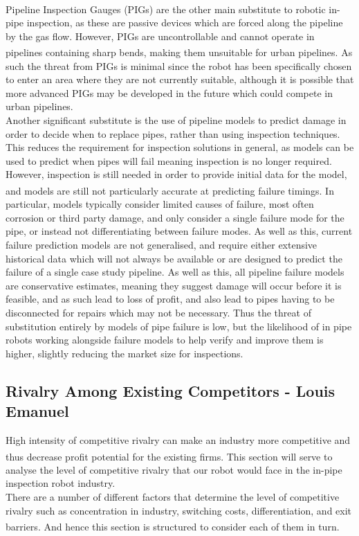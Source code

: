 \documentclass[11pt]{article}		%
\newcommand{\supercite}[1]{\textsuperscript{\cite{#1}}}		%
\begin{document}
			\\
			Pipeline Inspection Gauges (PIGs) are the other main substitute to robotic in-pipe inspection, as these are passive devices which are forced along the pipeline by the gas flow.
			However, PIGs are uncontrollable and cannot operate in pipelines containing sharp bends\supercite{mills2017advances}, making them unsuitable for urban pipelines.
			As such the threat from PIGs is minimal since the robot has been specifically chosen to enter an area where they are not currently suitable, although it is possible that more advanced PIGs may be developed in the future which could compete in urban pipelines.
			\\
			Another significant substitute is the use of pipeline models to predict damage in order to decide when to replace pipes, rather than using inspection techniques.
			This reduces the requirement for inspection solutions in general, as models can be used to predict when pipes will fail meaning inspection is no longer required.
			However, inspection is still needed in order to provide initial data for the model, and models are still not particularly accurate at predicting failure timings\supercite{zakikhani2020review}.
			In particular, models typically consider limited causes of failure, most often corrosion or third party damage, and only consider a single failure mode for the pipe, or instead not differentiating between failure modes.
			As well as this, current failure prediction models are not generalised, and require either extensive historical data which will not always be available or are designed to predict the failure of a single case study pipeline.
			As well as this, all pipeline failure models are conservative estimates, meaning they suggest damage will occur before it is feasible, and as such lead to loss of profit, and also lead to pipes having to be disconnected for repairs which may not be necessary.
			Thus the threat of substitution entirely by models of pipe failure is low, but the likelihood of in pipe robots working alongside failure models to help verify and improve them is higher, slightly reducing the market size for inspections.
		
		\subsection[Rivalry Among Existing Competitors]{Rivalry Among Existing Competitors - Louis Emanuel}
			High intensity of competitive rivalry can make an industry more competitive and thus decrease profit potential for the existing firms\supercite{porter2008five}. This section will serve to analyse the level of competitive rivalry that our robot would face in the in-pipe inspection robot industry. \\
	        \hspace*{3ex}There are a number of different factors that determine the level of competitive rivalry such as concentration in industry, switching costs, differentiation, and exit barriers\supercite{rivalryfactorsCI}. And hence this section is structured to consider each of them in turn. 
	        
\end{document}
